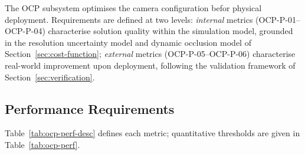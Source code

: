 The \gls{OCP} subsystem optimises the camera configuration befor physical deployment. Requirements are defined at two levels: \textit{internal} metrics (OCP-P-01--OCP-P-04) characterise solution quality within the simulation model, grounded in the resolution uncertainty model \parencite{sharmaAnalysisUncertaintyBounds1998} and dynamic occlusion model \parencite{rahimianOptimalCameraPlacement2017} of Section~\ref{sec:cost-function}; \textit{external} metrics (OCP-P-05--OCP-P-06) characterise real-world improvement upon deployment, following the validation framework of Section~\ref{sec:verification}.

\subsection{Performance Requirements}

Table~\ref{tab:ocp-perf-desc} defines each metric; quantitative thresholds are given in Table~\ref{tab:ocp-perf}.

